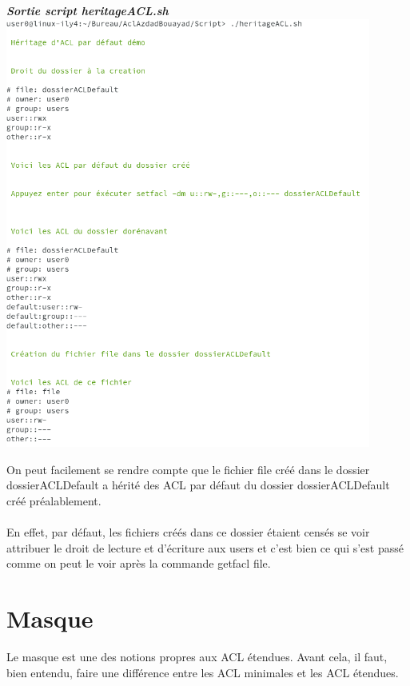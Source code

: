 \documentclass{article}
\begin{document}
\begin{center}
    \textbf{\textit{Sortie script heritageACL.sh}}
\includegraphics[width=12cm]{images/sortieHeritageACL.png}
\end{center}
On peut facilement se rendre compte que le fichier file créé dans le dossier dossierACLDefault a hérité des ACL par défaut du dossier dossierACLDefault créé préalablement. \\\\
En effet, par défaut, les fichiers créés dans ce dossier étaient censés se voir attribuer le droit de lecture et d'écriture aux users et c'est bien ce qui s'est passé comme on peut le voir après la commande getfacl file.
\newpage
\section{Masque}
Le masque est une des notions propres aux ACL étendues. Avant cela, il faut, bien entendu, faire une différence entre les ACL minimales et les ACL étendues. 
\end{document}
